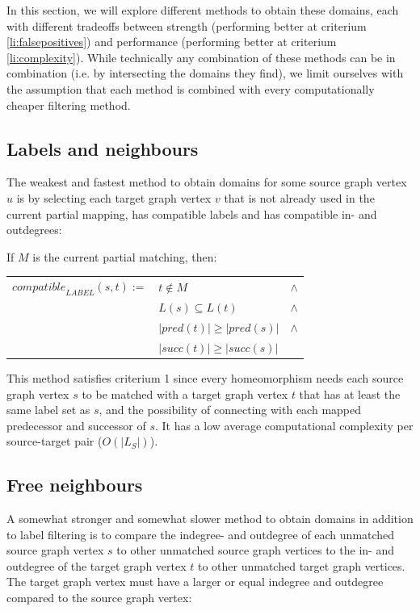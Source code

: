 In this section, we will explore different methods to obtain these domains, each with different tradeoffs between strength (performing better at criterium \ref{li:falsepositives}) and performance (performing better at criterium \ref{li:complexity}). While technically any combination of these methods can be in combination (i.e. by intersecting the domains they find), we limit ourselves with the assumption that each method is combined with every computationally cheaper filtering method.
\subsection{Labels and neighbours}
The weakest and fastest method to obtain domains for some source graph vertex $u$ is by selecting each target graph vertex $v$ that is not already used in the current partial mapping, has compatible labels and has compatible in- and outdegrees:

\begin{minipage}{\textwidth}
\begin{defn} If $M$ is the current partial matching, then:

\begin{center}
\bgroup
\def\arraystretch{1.2}
\setlength\tabcolsep{5pt}
\begin{tabular}{lll}
\centering
$\mathit{compatible}_{\mathit{LABEL}}(s,t) := $&$t \not \in M$&$\land$\\
&$L(s) \subseteq L(t)$&$\land$\\
&$|\mathit{pred}(t)| \geq |\mathit{pred}(s)|$&$\land$\\
&$|\mathit{succ}(t)| \geq |\mathit{succ}(s)|$&\\
\end{tabular}
\egroup
\end{center}

\end{defn}
\end{minipage}

This method satisfies criterium 1 since every homeomorphism needs each source graph vertex $s$ to be matched with a target graph vertex $t$ that has at least the same label set as $s$, and the possibility of connecting with each mapped predecessor and successor of $s$. It has a low average computational complexity per source-target pair ($O(|L_S|)$).

\subsection{Free neighbours}
A somewhat stronger and somewhat slower method to obtain domains in addition to label filtering is to compare the indegree- and outdegree of each unmatched source graph vertex $s$ to other unmatched source graph vertices to the in- and outdegree of the target graph vertex $t$ to other unmatched target graph vertices. The target graph vertex must have a larger or equal indegree and outdegree compared to the source graph vertex:


